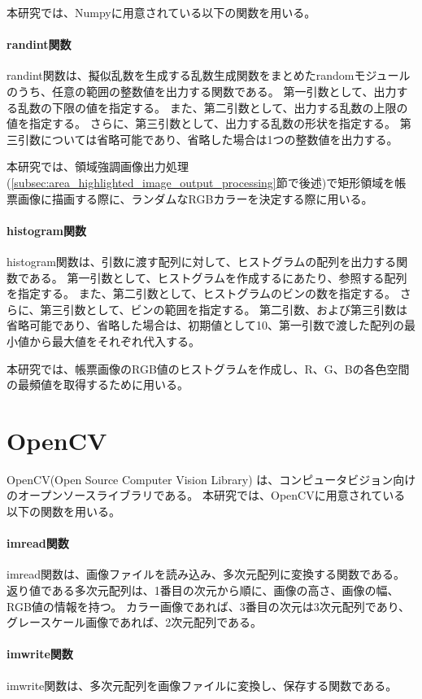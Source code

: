 本研究では、Numpyに用意されている以下の関数を用いる。

\paragraph{randint関数}
randint関数は、擬似乱数を生成する乱数生成関数をまとめたrandomモジュールのうち、任意の範囲の整数値を出力する関数である\cite{randint関数}。
第一引数として、出力する乱数の下限の値を指定する。
また、第二引数として、出力する乱数の上限の値を指定する。
さらに、第三引数として、出力する乱数の形状を指定する。
第三引数については省略可能であり、省略した場合は1つの整数値を出力する。

本研究では、領域強調画像出力処理(\ref{subsec:area_highlighted_image_output_processing}節で後述)で矩形領域を帳票画像に描画する際に、ランダムなRGBカラーを決定する際に用いる。

\paragraph{histogram関数}
histogram関数は、引数に渡す配列に対して、ヒストグラムの配列を出力する関数である。
第一引数として、ヒストグラムを作成するにあたり、参照する配列を指定する。
また、第二引数として、ヒストグラムのビンの数を指定する。
さらに、第三引数として、ビンの範囲を指定する。
第二引数、および第三引数は省略可能であり、省略した場合は、初期値として10、第一引数で渡した配列の最小値から最大値をそれぞれ代入する。

本研究では、帳票画像のRGB値のヒストグラムを作成し、R、G、Bの各色空間の最頻値を取得するために用いる。

\section{OpenCV}\label{sec:OpenCV}
OpenCV(Open Source Computer Vision Library) は、コンピュータビジョン向けのオープンソースライブラリである\cite{OpenCV}。
本研究では、OpenCVに用意されている以下の関数を用いる。

\paragraph{imread関数}
imread関数は、画像ファイルを読み込み、多次元配列に変換する関数である\cite{imread関数}。
返り値である多次元配列は、1番目の次元から順に、画像の高さ、画像の幅、RGB値の情報を持つ。
カラー画像であれば、3番目の次元は3次元配列であり、グレースケール画像であれば、2次元配列である。

\paragraph{imwrite関数}
imwrite関数は、多次元配列を画像ファイルに変換し、保存する関数である。

